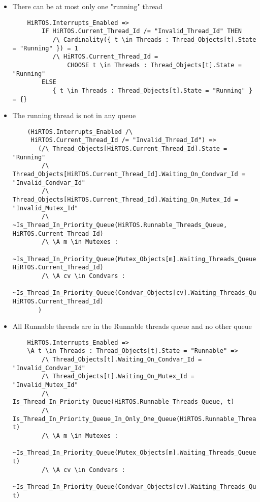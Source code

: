 \documentclass[11pt,letterpaper,twoside,openany]{book}
\begin{document}
\begin{itemize}
\item There can be at most only one "running" thread

\begin{lstlisting}
    HiRTOS.Interrupts_Enabled =>
        IF HiRTOS.Current_Thread_Id /= "Invalid_Thread_Id" THEN
           /\ Cardinality({ t \in Threads : Thread_Objects[t].State = "Running" }) = 1
           /\ HiRTOS.Current_Thread_Id =
               CHOOSE t \in Threads : Thread_Objects[t].State = "Running"
        ELSE
           { t \in Threads : Thread_Objects[t].State = "Running" } = {}
\end{lstlisting}

\item The running thread is not in any queue
\begin{lstlisting}
    (HiRTOS.Interrupts_Enabled /\
     HiRTOS.Current_Thread_Id /= "Invalid_Thread_Id") =>
       (/\ Thread_Objects[HiRTOS.Current_Thread_Id].State = "Running"
        /\ Thread_Objects[HiRTOS.Current_Thread_Id].Waiting_On_Condvar_Id = "Invalid_Condvar_Id"
        /\ Thread_Objects[HiRTOS.Current_Thread_Id].Waiting_On_Mutex_Id = "Invalid_Mutex_Id"
        /\ ~Is_Thread_In_Priority_Queue(HiRTOS.Runnable_Threads_Queue, HiRTOS.Current_Thread_Id)
        /\ \A m \in Mutexes :
             ~Is_Thread_In_Priority_Queue(Mutex_Objects[m].Waiting_Threads_Queue, HiRTOS.Current_Thread_Id)
        /\ \A cv \in Condvars :
             ~Is_Thread_In_Priority_Queue(Condvar_Objects[cv].Waiting_Threads_Queue, HiRTOS.Current_Thread_Id)
       )
\end{lstlisting}

\item All Runnable threads are in the Runnable threads queue and no other queue
\begin{lstlisting}
    HiRTOS.Interrupts_Enabled =>
    \A t \in Threads : Thread_Objects[t].State = "Runnable" =>
        /\ Thread_Objects[t].Waiting_On_Condvar_Id = "Invalid_Condvar_Id"
        /\ Thread_Objects[t].Waiting_On_Mutex_Id = "Invalid_Mutex_Id"
        /\ Is_Thread_In_Priority_Queue(HiRTOS.Runnable_Threads_Queue, t)
        /\ Is_Thread_In_Priority_Queue_In_Only_One_Queue(HiRTOS.Runnable_Threads_Queue, t)
        /\ \A m \in Mutexes :
             ~Is_Thread_In_Priority_Queue(Mutex_Objects[m].Waiting_Threads_Queue, t)
        /\ \A cv \in Condvars :
             ~Is_Thread_In_Priority_Queue(Condvar_Objects[cv].Waiting_Threads_Queue, t)
\end{lstlisting}


\end{itemize}
\end{document}
